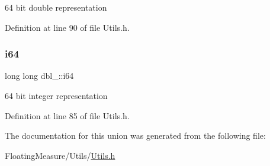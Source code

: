 64 bit double representation 



Definition at line 90 of file Utils.\+h.

\mbox{\label{uniondbl__64_a6f97524990aa26aaa1618b7288301841}} 
\subsubsection{\texorpdfstring{i64}{i64}}
{\footnotesize\ttfamily long long dbl\+\_\+::i64}



64 bit integer representation 



Definition at line 85 of file Utils.\+h.



The documentation for this union was generated from the following file\+:\begin{DoxyCompactItemize}
\item 
Floating\+Measure/\+Utils/\hyperlink{Utils_8h}{Utils.\+h}\end{DoxyCompactItemize}
